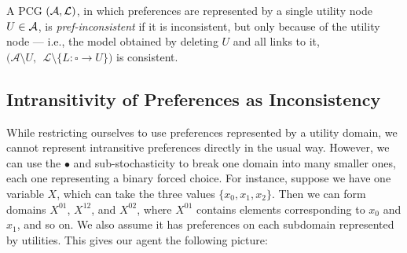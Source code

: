 \documentclass{article}
\begin{document}
	\begin{defn}
		A PCG $(\cal A, L)$, in which preferences are represented by a single utility node $U \in \cal A$, is \textit{pref-inconsistent} if it is inconsistent, but only because of the utility node --- i.e., the model obtained by deleting $U$ and all links to it, $\big(\mathcal A \setminus U,~~\mathcal L \setminus \{ L : \square\to U \}\big)$ is consistent.
	\end{defn}
	
	\subsection{Intransitivity of Preferences as Inconsistency}
	

	
	While restricting ourselves to use preferences represented by a utility domain, we cannot represent intransitive preferences directly in the usual way. However, we can use the $\bullet$ and sub-stochasticity to break one domain into many smaller ones, each one representing a binary forced choice. For instance, suppose we have one variable $X$, which can take the three values $\{x_0, x_1, x_2\}$. Then we can form domains $X^{01}$, $X^{12}$, and $X^{02}$, where $X^{01}$ contains elements corresponding to $x_0$ and $x_1$, and so on. We also assume it has preferences on each subdomain represented by utilities. This gives our agent the following picture:
	
	\begin{center}
	\end{center}
	
\end{document}
